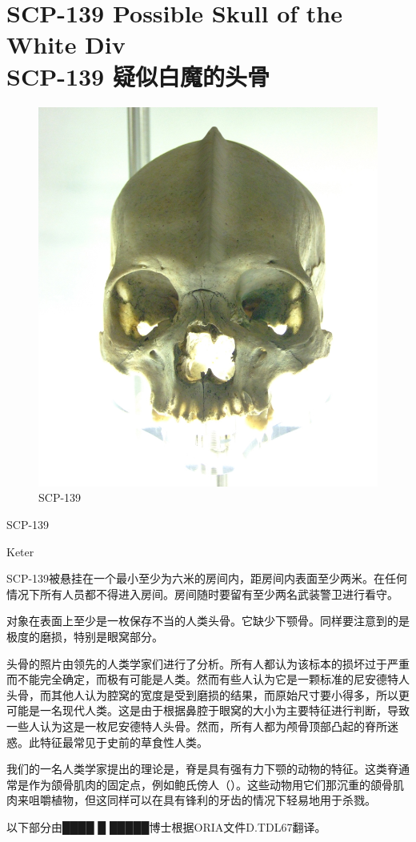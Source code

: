 \chapter[SCP-139 疑似白魔的头骨]{
    SCP-139 Possible Skull of the White Div\\
    SCP-139 疑似白魔的头骨
}

\label{chap:SCP-139}

\begin{figure}[H]
    \centering
    \includegraphics[width=0.5\linewidth]{images/SCP.139.jpg}
    \caption*{SCP-139}
\end{figure}

SCP-139

Keter

SCP-139被悬挂在一个最小至少为六米的房间内，距房间内表面至少两米。在任何情况下所有人员都不得进入房间。房间随时要留有至少两名武装警卫进行看守。

对象在表面上至少是一枚保存不当的人类头骨。它缺少下颚骨。同样要注意到的是极度的磨损，特别是眼窝部分。

头骨的照片由领先的人类学家们进行了分析。所有人都认为该标本的损坏过于严重而不能完全确定，而极有可能是人类。然而有些人认为它是一颗标准的尼安德特人头骨，而其他人认为腔窝的宽度是受到磨损的结果，而原始尺寸要小得多，所以更可能是一名现代人类。这是由于根据鼻腔于眼窝的大小为主要特征进行判断，导致一些人认为这是一枚尼安德特人头骨。然而，所有人都为颅骨顶部凸起的脊所迷惑。此特征最常见于史前的草食性人类。

我们的一名人类学家提出的理论是，脊是具有强有力下颚的动物的特征。这类脊通常是作为颌骨肌肉的固定点，例如鲍氏傍人（）。这些动物用它们那沉重的颌骨肌肉来咀嚼植物，但这同样可以在具有锋利的牙齿的情况下轻易地用于杀戮。

以下部分由████ █ █████博士根据ORIA文件D.TDL67翻译。

